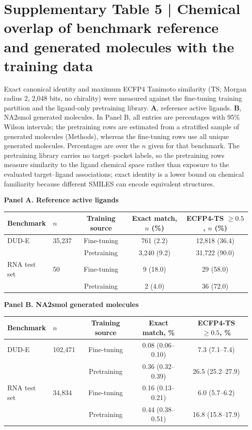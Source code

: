 \section*{Supplementary Table 5 | Chemical overlap of benchmark reference and generated molecules with the training data}
Exact canonical identity and maximum ECFP4 Tanimoto similarity (TS; Morgan radius 2, 2,048
bits, no chirality) were measured against the fine-tuning training partition and the ligand-only
pretraining library. \textbf{A}, reference active ligands. \textbf{B}, NA2smol generated
molecules. In Panel B, all entries are percentages with 95\% Wilson intervals; the pretraining
rows are estimated from a stratified sample of generated molecules (Methods), whereas the
fine-tuning rows use all unique generated molecules. Percentages are over the $n$ given for that
benchmark. The pretraining library carries no target--pocket labels, so the pretraining rows
measure similarity to the ligand chemical space rather than exposure to the evaluated
target--ligand associations; exact identity is a lower bound on chemical familiarity because
different SMILES can encode equivalent structures.

\textbf{Panel A. Reference active ligands}
\begin{center}\footnotesize
\setlength{\tabcolsep}{6pt}
\begin{tabular}{@{}llccc@{}}
\toprule
\textbf{Benchmark} & \textbf{$n$} & \textbf{Training source} & \textbf{Exact match, $n$ (\%)} & \textbf{ECFP4-TS $\geq0.5$, $n$ (\%)} \\
\midrule
DUD-E          & 35,237  & Fine-tuning  & 761 (2.2)   & 12,818 (36.4) \\
               &         & Pretraining  & 3,240 (9.2) & 31,722 (90.0) \\
RNA test set   & 50      & Fine-tuning  & 9 (18.0)    & 29 (58.0) \\
               &         & Pretraining  & 2 (4.0)     & 36 (72.0) \\
\bottomrule
\end{tabular}\end{center}

\textbf{Panel B. NA2smol generated molecules}
\begin{center}\scriptsize
\setlength{\tabcolsep}{3pt}
\begin{tabular}{@{}llccc@{}}
\toprule
\textbf{Benchmark} & \textbf{$n$} & \textbf{Training source} & \textbf{Exact match, \%} & \textbf{ECFP4-TS $\geq0.5$, \%} \\
\midrule
DUD-E          & 102,471 & Fine-tuning  & 0.08 (0.06--0.10) & 7.3 (7.1--7.4) \\
               &         & Pretraining  & 0.36 (0.32--0.39) & 26.5 (25.2--27.9) \\
RNA test set   & 34,834  & Fine-tuning  & 0.16 (0.13--0.21) & 6.0 (5.7--6.2) \\
               &         & Pretraining  & 0.44 (0.38--0.51) & 16.8 (15.8--17.9) \\
\bottomrule
\end{tabular}\end{center}
